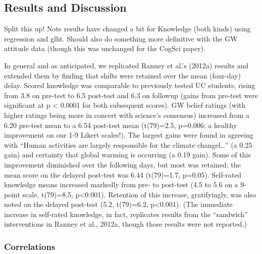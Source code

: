 \subsection{Results and Discussion} 

Split this up! Note results have changed a bit for Knowledge (both kinds) using
regression and glht. Should also do something more definitive with the GW
attitude data (though this was unchanged for the CogSci paper).

In general and as anticipated, we replicated Ranney et
al.’s (2012a) results and extended them by finding that shifts were retained
over the mean (four-day) delay. 
Scored knowledge was comparable to previously
tested UC students, rising from 3.8 on pre-test to 6.5 post-test and 6.3 on
followup (gains from pre-test were significant at p < 0.0001 for both subsequent
scores). GW belief ratings (with higher ratings being
more in concert with science’s consensus) increased from a 6.20 pre-test mean to
a 6.54 post-test mean (t(79)=2.5, p=0.006; a healthy improvement on our 1-9
Likert scales!). The largest gains were found in agreeing with ``Human activities
are largely responsible for the climate changel\ldots'' (a 0.25 gain) and certainty
that global warming is occurring (a 0.19 gain). 
Some of this improvement
diminished over the following days, but most was retained: the mean score on the
delayed post-test was 6.44 (t(79)=1.7, p=0.05). Self-rated knowledge means
increased markedly from pre- to post-test (4.5 to 5.6 on a 9-point scale,
t(79)=8.5, p<0.001). Retention of this increase, gratifyingly, was also noted on
the delayed post-test (5.2, t(79)=6.2, p<0.001). (The immediate increase in
self-rated knowledge, in fact, replicates results from the ``sandwich''
interventions in Ranney et al., 2012a, though those results were not reported.)


\subsubsection{Correlations}


